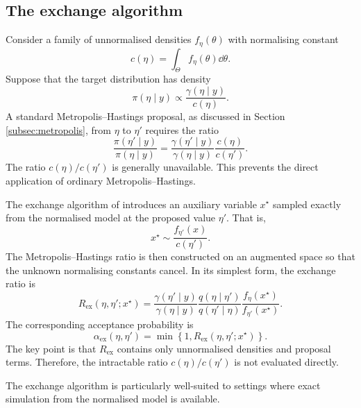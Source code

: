 \subsection{The exchange algorithm}
\label{subsec:exchange-algorithm}

Consider a family of unnormalised densities $f_\eta(\theta)$ with normalising constant
\begin{equation}
c(\eta)
=
\int_\Theta f_\eta(\theta) \dd \theta.
\end{equation}
Suppose that the target distribution has density
\begin{equation}
\pi(\eta \mid y)
\propto
\frac{\gamma(\eta \mid y)}{c(\eta)}.
\end{equation}
A standard Metropolis--Hastings proposal, as discussed in Section \ref{subsec:metropolis}, from $\eta$ to $\eta'$ requires the ratio
\begin{equation}
\frac{\pi(\eta' \mid y)}{\pi(\eta \mid y)}
=
\frac{\gamma(\eta' \mid y)}{\gamma(\eta \mid y)}
\frac{c(\eta)}{c(\eta')}.
\end{equation}
The ratio $c(\eta)/c(\eta')$ is generally unavailable.
This prevents the direct application of ordinary Metropolis--Hastings.

The exchange algorithm of  introduces an auxiliary variable $x^\star$ sampled exactly from the normalised model at the proposed value $\eta'$.
That is,
\begin{equation}
x^\star
\sim
\frac{f_{\eta'}(x)}{c(\eta')}.
\end{equation}
The Metropolis--Hastings ratio is then constructed on an augmented space so that the unknown normalising constants cancel.
In its simplest form, the exchange ratio is
\begin{equation}
R_{\mathrm{ex}}(\eta,\eta';x^\star)
=
\frac{\gamma(\eta' \mid y)}{\gamma(\eta \mid y)}
\frac{q(\eta \mid \eta')}{q(\eta' \mid \eta)}
\frac{f_\eta(x^\star)}{f_{\eta'}(x^\star)}.
\end{equation}
The corresponding acceptance probability is
\begin{equation}
\alpha_{\mathrm{ex}}(\eta,\eta')
=
\min
\left\{
1,
R_{\mathrm{ex}}(\eta,\eta';x^\star)
\right\}.
\end{equation}
The key point is that $R_{\mathrm{ex}}$ contains only unnormalised densities and proposal terms.
Therefore, the intractable ratio $c(\eta)/c(\eta')$ is not evaluated directly.

The exchange algorithm is particularly well-suited to settings where exact simulation from the normalised model is available.

